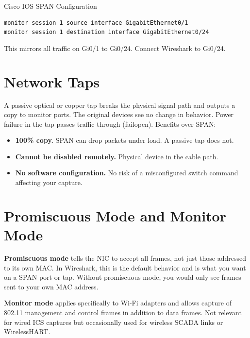 \documentclass[12pt,twoside,openright]{memoir}
\begin{document}
\begin{example}{Cisco IOS SPAN Configuration}
\begin{lstlisting}
monitor session 1 source interface GigabitEthernet0/1
monitor session 1 destination interface GigabitEthernet0/24
\end{lstlisting}
This mirrors all traffic on Gi0/1 to Gi0/24. Connect Wireshark to Gi0/24.
\end{example}

\section{Network Taps}

A passive optical or copper tap breaks the physical signal path and outputs a copy to monitor ports. The original devices see no change in behavior. Power failure in the tap passes traffic through (failopen). Benefits over SPAN:
\begin{itemize}[noitemsep]
  \item \textbf{100\% copy.} SPAN can drop packets under load. A passive tap does not.
  \item \textbf{Cannot be disabled remotely.} Physical device in the cable path.
  \item \textbf{No software configuration.} No risk of a misconfigured switch command affecting your capture.
\end{itemize}


\section{Promiscuous Mode and Monitor Mode}

\textbf{Promiscuous mode} tells the NIC to accept all frames, not just those addressed to its own MAC. In Wireshark, this is the default behavior and is what you want on a SPAN port or tap. Without promiscuous mode, you would only see frames sent to your own MAC address.

\textbf{Monitor mode} applies specifically to Wi-Fi adapters and allows capture of 802.11 management and control frames in addition to data frames. Not relevant for wired ICS captures but occasionally used for wireless SCADA links or WirelessHART.
\end{document}
